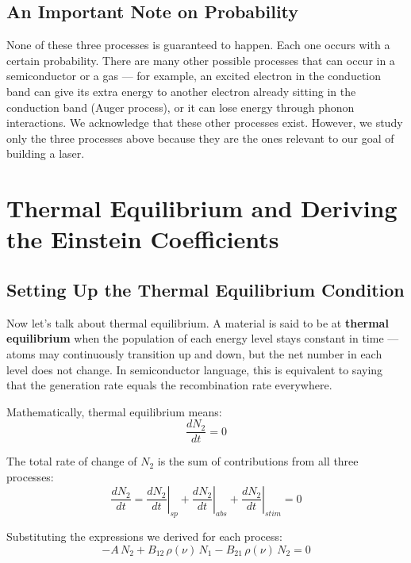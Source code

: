 \subsection{An Important Note on Probability}

None of these three processes is guaranteed to happen. Each one occurs with a certain probability. There are many other possible processes that can occur in a semiconductor or a gas — for example, an excited electron in the conduction band can give its extra energy to another electron already sitting in the conduction band (Auger process), or it can lose energy through phonon interactions. We acknowledge that these other processes exist. However, we study only the three processes above because they are the ones relevant to our goal of building a laser.

\section{Thermal Equilibrium and Deriving the Einstein Coefficients}

\subsection{Setting Up the Thermal Equilibrium Condition}

Now let's talk about thermal equilibrium. A material is said to be at \textbf{thermal equilibrium} when the population of each energy level stays constant in time — atoms may continuously transition up and down, but the net number in each level does not change. In semiconductor language, this is equivalent to saying that the generation rate equals the recombination rate everywhere.

Mathematically, thermal equilibrium means:
\begin{equation*}
    \frac{dN_2}{dt} = 0
\end{equation*}

The total rate of change of $N_2$ is the sum of contributions from all three processes:
\begin{equation*}
    \frac{dN_2}{dt} = \left.\frac{dN_2}{dt}\right|_{sp} + \left.\frac{dN_2}{dt}\right|_{abs} + \left.\frac{dN_2}{dt}\right|_{stim} = 0
\end{equation*}

Substituting the expressions we derived for each process:
\begin{equation*}
    -A\,N_2 + B_{12}\,\rho(\nu)\,N_1 - B_{21}\,\rho(\nu)\,N_2 = 0
\end{equation*}

